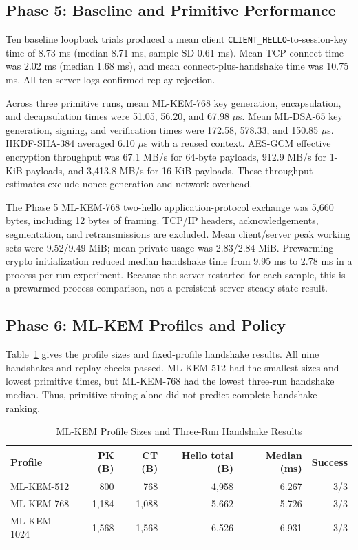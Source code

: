 \documentclass[journal]{IEEEtran}
\begin{document}
\subsection{Phase 5: Baseline and Primitive Performance}
Ten baseline loopback trials produced a mean client \texttt{CLIENT\_HELLO}-to-session-key time of 8.73 ms (median 8.71 ms, sample SD 0.61 ms). Mean TCP connect time was 2.02 ms (median 1.68 ms), and mean connect-plus-handshake time was 10.75 ms. All ten server logs confirmed replay rejection.

Across three primitive runs, mean ML-KEM-768 key generation, encapsulation, and decapsulation times were 51.05, 56.20, and 67.98 $\mu$s. Mean ML-DSA-65 key generation, signing, and verification times were 172.58, 578.33, and 150.85 $\mu$s. HKDF-SHA-384 averaged 6.10 $\mu$s with a reused context. AES-GCM effective encryption throughput was 67.1 MB/s for 64-byte payloads, 912.9 MB/s for 1-KiB payloads, and 3,413.8 MB/s for 16-KiB payloads. These throughput estimates exclude nonce generation and network overhead.

The Phase 5 ML-KEM-768 two-hello application-protocol exchange was 5,660 bytes, including 12 bytes of framing. TCP/IP headers, acknowledgements, segmentation, and retransmissions are excluded. Mean client/server peak working sets were 9.52/9.49 MiB; mean private usage was 2.83/2.84 MiB. Prewarming crypto initialization reduced median handshake time from 9.95 ms to 2.78 ms in a process-per-run experiment. Because the server restarted for each sample, this is a prewarmed-process comparison, not a persistent-server steady-state result.

\subsection{Phase 6: ML-KEM Profiles and Policy}
Table~\ref{tab:profile} gives the profile sizes and fixed-profile handshake results. All nine handshakes and replay checks passed. ML-KEM-512 had the smallest sizes and lowest primitive times, but ML-KEM-768 had the lowest three-run handshake median. Thus, primitive timing alone did not predict complete-handshake ranking.

\begin{table}[t]
\caption{ML-KEM Profile Sizes and Three-Run Handshake Results}
\label{tab:profile}
\centering
\footnotesize
\begin{tabular}{lrrrrr}
\toprule
Profile & PK (B) & CT (B) & Hello total (B) & Median (ms) & Success \\
\midrule
ML-KEM-512  & 800  & 768  & 4,958 & 6.267 & 3/3 \\
ML-KEM-768  & 1,184& 1,088& 5,662 & 5.726 & 3/3 \\
ML-KEM-1024 & 1,568& 1,568& 6,526 & 6.931 & 3/3 \\
\bottomrule
\end{tabular}
\end{table}
\end{document}
